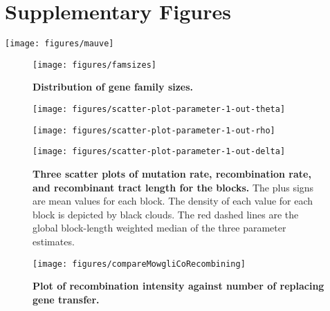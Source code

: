 \documentclass[12pt]{article}
\begin{document}
\section*{Supplementary Figures}

\begin{sidewaysfigure}[!ht]
\begin{center}
\texttt{[image: figures/mauve]}
\end{center}
\caption{\label{fig:mauve}
{\bf The genome alignment of the five genomes.} The top
first and second rows are SDE1 and SDE2 genomes, respectively. The third is SDD
genome. The fourth and fifth rows are SPY1 and SPY2 genomes, respectively.}
\end{sidewaysfigure}

\begin{figure}[!ht]
\begin{center}
\texttt{[image: figures/famsizes]}
\end{center}
\caption{{\bf Distribution of gene family sizes.}}
\label{fig:famsizes}
\end{figure}
\clearpage{}

\begin{figure}[!ht]
\begin{center}
\texttt{[image: figures/scatter-plot-parameter-1-out-theta]}

\texttt{[image: figures/scatter-plot-parameter-1-out-rho]}

\texttt{[image: figures/scatter-plot-parameter-1-out-delta]}
\end{center}
\caption{
{\bf Three scatter plots of mutation rate, recombination
rate, and recombinant tract length for the blocks.} The plus signs are mean values
for each block. The density of each value for each block is depicted by black
clouds.  The red dashed lines are the global block-length weighted median of the
three parameter estimates.}\label{fig:scatter3}
\end{figure}
\clearpage{}%


\begin{figure}[!ht]
\begin{center}
\texttt{[image: figures/compareMowgliCoRecombining]}
\end{center}
\caption{
{\bf Plot of recombination intensity against number
of replacing gene transfer.}}
\label{fig:cmpcomowgli}
\end{figure}
\clearpage{}
\end{document}
